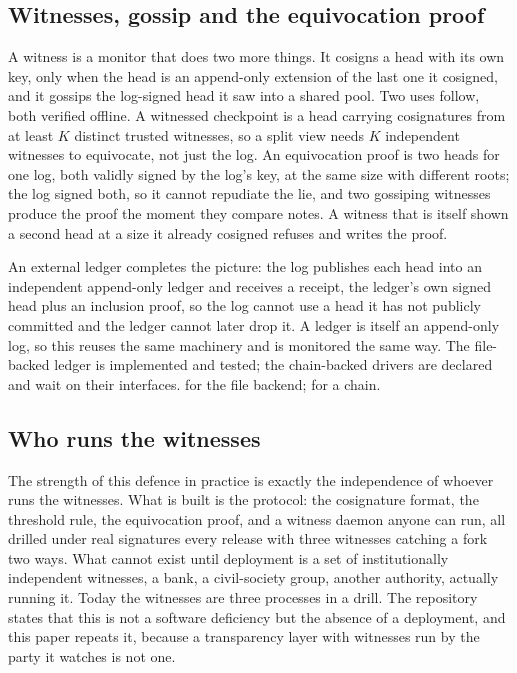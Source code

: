 \subsection{Witnesses, gossip and the equivocation proof}

A witness is a monitor that does two more things. It cosigns a head with its own key, only when the
head is an append-only extension of the last one it cosigned, and it gossips the log-signed head it
saw into a shared pool. Two uses follow, both verified offline. A witnessed checkpoint is a head
carrying cosignatures from at least $K$ distinct trusted witnesses, so a split view needs $K$
independent witnesses to equivocate, not just the log. An equivocation proof is two heads for one
log, both validly signed by the log's key, at the same size with different roots; the log signed
both, so it cannot repudiate the lie, and two gossiping witnesses produce the proof the moment they
compare notes. A witness that is itself shown a second head at a size it already cosigned refuses
and writes the proof. \sImpl

An external ledger completes the picture: the log publishes each head into an independent
append-only ledger and receives a receipt, the ledger's own signed head plus an inclusion proof, so
the log cannot use a head it has not publicly committed and the ledger cannot later drop it. A
ledger is itself an append-only log, so this reuses the same machinery and is monitored the same
way. The file-backed ledger is implemented and tested; the chain-backed drivers are declared and wait
on their interfaces. \sImpl{} for the file backend; \sFut{} for a chain.


\subsection{Who runs the witnesses}

The strength of this defence in practice is exactly the independence of whoever runs the
witnesses. What is built is the protocol: the cosignature format, the threshold rule, the
equivocation proof, and a witness daemon anyone can run, all drilled under real signatures every
release with three witnesses catching a fork two ways. What cannot exist until deployment is a set
of institutionally independent witnesses, a bank, a civil-society group, another authority,
actually running it. Today the witnesses are three processes in a drill. The repository states that
this is not a software deficiency but the absence of a deployment, and this paper repeats it,
because a transparency layer with witnesses run by the party it watches is not one. \sExt

